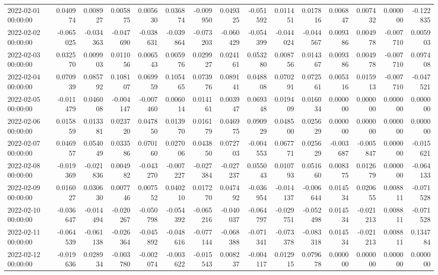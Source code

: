 \begin{tabular}{lrrrrrrrrrrrrrr}
2022-02-01 00:00:00 & 0.040974 & 0.008927 & 0.005875 & 0.005630 & 0.036874 & -0.009950 & 0.049325 & -0.051592 & 0.011451 & 0.017816 & 0.006847 & 0.007432 & 0.000000 & -0.122835 \\
2022-02-02 00:00:00 & -0.065025 & -0.034363 & -0.047690 & -0.038631 & -0.039864 & -0.073203 & -0.060429 & -0.054399 & -0.044024 & -0.044567 & 0.009386 & 0.004978 & -0.007710 & 0.005903 \\
2022-02-03 00:00:00 & 0.032570 & 0.009903 & 0.011056 & 0.006543 & 0.005976 & 0.029927 & 0.024161 & 0.053280 & 0.008756 & 0.014367 & 0.009386 & 0.004978 & -0.007710 & 0.097408 \\
2022-02-04 00:00:00 & 0.070939 & 0.085792 & 0.108107 & 0.069959 & 0.105465 & 0.073976 & 0.089141 & 0.048808 & 0.070291 & 0.072561 & 0.005316 & 0.015913 & -0.007710 & -0.047521 \\
2022-02-05 00:00:00 & -0.011479 & 0.046008 & -0.004147 & -0.007460 & 0.006014 & 0.014161 & 0.003947 & 0.069348 & 0.019409 & 0.016034 & 0.000000 & 0.000000 & 0.000000 & 0.000000 \\
2022-02-06 00:00:00 & 0.015859 & 0.013381 & 0.023720 & 0.047850 & 0.013970 & 0.016179 & 0.046975 & 0.090929 & 0.048500 & 0.025629 & 0.000000 & 0.000000 & 0.000000 & 0.000000 \\
2022-02-07 00:00:00 & 0.046957 & 0.054049 & 0.033586 & 0.070160 & 0.027006 & 0.043850 & 0.072703 & -0.004553 & 0.067771 & 0.025629 & -0.003687 & -0.005847 & 0.000000 & -0.015621 \\
2022-02-08 00:00:00 & -0.019369 & -0.021836 & 0.004982 & -0.043270 & -0.007227 & -0.027384 & -0.027237 & 0.055043 & 0.010793 & 0.051660 & 0.008375 & 0.012679 & 0.000000 & -0.064133 \\
2022-02-09 00:00:00 & 0.016027 & 0.030630 & 0.007746 & 0.007552 & 0.040210 & 0.017270 & 0.047492 & -0.036954 & -0.014137 & -0.006644 & 0.014534 & 0.020655 & 0.008811 & -0.071528 \\
2022-02-10 00:00:00 & -0.036647 & -0.014494 & -0.020267 & -0.050798 & -0.054392 & -0.065216 & -0.040037 & -0.064797 & -0.029751 & -0.052498 & 0.014534 & -0.021213 & 0.008811 & -0.071528 \\
2022-02-11 00:00:00 & -0.064539 & -0.061138 & -0.026364 & -0.045892 & -0.048616 & -0.077144 & -0.068388 & -0.071341 & -0.073378 & -0.083318 & 0.014534 & -0.021213 & 0.008811 & 0.134784 \\
2022-02-12 00:00:00 & -0.019636 & 0.028934 & -0.003780 & -0.002074 & -0.003622 & -0.015543 & 0.008237 & -0.004117 & 0.012915 & 0.079678 & 0.000000 & 0.000000 & 0.000000 & 0.000000 \\

\end{tabular}
